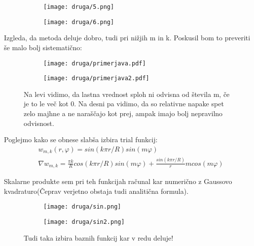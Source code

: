 \documentclass{article}
\begin{document}
\begin{figure}[H]
\centering
\begin{subfigure}{.49\textwidth}
\texttt{[image: druga/5.png]}
\end{subfigure}
\begin{subfigure}{.49\textwidth}
\texttt{[image: druga/6.png]}
\end{subfigure}
\caption*{}
\end{figure}


Izgleda, da metoda deluje dobro, tudi pri nižjih m in k. Poskusil bom to preveriti še malo bolj sistematično:

\begin{figure}[H]
\centering
\begin{subfigure}{.49\textwidth}
\texttt{[image: druga/primerjava.pdf]}
\end{subfigure}
\begin{subfigure}{.49\textwidth}
\texttt{[image: druga/primerjava2.pdf]}
\end{subfigure}
\caption*{Na levi vidimo, da lastna vrednost sploh ni odvisna od števila m, če je to le več kot 0. Na desni pa vidimo, da so relativne napake spet zelo majhne a ne naraščajo kot prej, ampak imajo bolj nepravilno odvisnost.}
\end{figure}

Poglejmo kako se obnese slabša izbira trial funkcij:
\begin{align*}
&w_{m,k}(r,\varphi) = sin(k\pi r/R) sin(m \varphi) \\ 
& \nabla w_{m,k} = \frac{\pi k}{R} cos(k \pi r/R) sin(m \varphi) + \frac{sin(k \pi r/R)}{r} m cos(m \varphi)
\end{align*}

Skalarne produkte sem pri teh funkcijah računal kar numerično z Gaussovo kvadraturo(Čeprav verjetno obstaja tudi analitična formula).

\begin{figure}[H]
\centering
\begin{subfigure}{.49\textwidth}
\texttt{[image: druga/sin.png]}
\end{subfigure}
\begin{subfigure}{.49\textwidth}
\texttt{[image: druga/sin2.png]}
\end{subfigure}
\caption*{Tudi taka izbira baznih funkcij kar v redu deluje!}
\end{figure}
\end{document}

